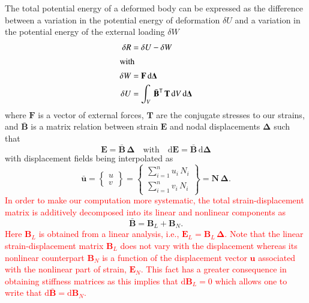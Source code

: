 The total potential energy of a deformed body can be expressed as the difference between a variation in the potential energy of deformation $\delta{U}$ and a variation in the potential energy of the external loading $\delta{W}$ \cite{Yangetal10}
\begin{subequations}
	\label{principle}
	\begin{align}
	\delta{R} &= \delta{U} - \delta{W}\\
	\intertext{with}
	\delta{W} & = \mathbf{F} \, \mathrm{d} \boldsymbol{\Delta}\\
	\delta{U} & = \int_{V} \, \bar{\mathbf{B}}^{\mathsf{T}} \, \mathbf{T} \, \mathrm{d} V \, \mathrm{d} \boldsymbol{\Delta}
	\end{align}
\end{subequations}
where $\mathbf{F}$ is a vector of external forces, $\mathbf{T}$ are the conjugate stresses to our strains, and $\bar{\mathbf{B}}$ is a matrix relation between strain $\mathbf{E}$ and nodal displacements $\boldsymbol{\Delta}$ such that
\begin{equation}
\mathbf{E} = \bar{\mathbf{B}} \,  \boldsymbol{\Delta} \quad \text{with} \quad \mathrm{d} \mathbf{E} = \bar{\mathbf{B}} \, \mathrm{d} \boldsymbol{\Delta}
\label{strain} 
\end{equation}
with displacement fields being interpolated as
\begin{equation}
\bar{\mathbf{ u}} = 
\begin{Bmatrix}
u \\
v     
\end{Bmatrix}
=
\begin{Bmatrix}
\sum_{i=1}^{n} u_i \, N_i \\
\sum_{i=1}^{n} v_i \, N_i     
\end{Bmatrix}
= \mathbf{N} \, \boldsymbol{\Delta} .
\end{equation} 
\textcolor{red}{In order to make our computation more systematic, the total strain-displacement matrix is additively decomposed into its linear and nonlinear components as}
\begin{equation}
\bar{\mathbf{B}} = \mathbf{B}_L + \mathbf{B}_N
\label{straindis}.
\end{equation} 
\textcolor{red}{Here $\mathbf{B}_L$ is obtained from a linear analysis, i.e., $\mathbf{E}_L = \mathbf{B}_L \, \boldsymbol{\Delta}$. Note that the linear strain-displacement matrix $\mathbf{B}_L$ does not vary with the displacement whereas its nonlinear counterpart $\mathbf{B}_N$ is a function of the displacement vector $ \mathbf{u}$ associated with the nonlinear part of strain, $\mathbf{E}_N$. This fact has a greater consequence in obtaining stiffness matrices as this implies that $\mathrm{d}\mathbf{B}_L=0$ which allows one to write that $\mathrm{d}\bar{\mathbf{B}}=\mathrm{d}\mathbf{B}_N$.}

